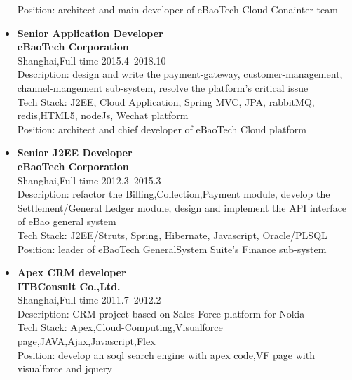 \documentclass[a4paper,11pt]{res}
\begin{document}
\begin{resume}
\begin{itemize}
    Position: architect and main developer of eBaoTech Cloud Conainter team \\
  \item{\bf Senior Application Developer}\\ {\bf eBaoTech Corporation}\\ Shanghai,Full-time \hfill 2015.4--2018.10\\
    
    Description: design and write the payment-gateway,
    customer-management, channel-mangement sub-system,
    resolve the platform's critical issue \\
    
    Tech Stack: J2EE, Cloud Application, Spring 
    MVC, JPA, rabbitMQ, redis,HTML5, nodeJs, Wechat platform  \\
    
    Position: architect and chief developer of eBaoTech Cloud platform \\

  \item{\bf Senior J2EE Developer}\\ {\bf eBaoTech Corporation}\\ Shanghai,Full-time \hfill 2012.3--2015.3\\
    
    Description: refactor the Billing,Collection,Payment module,
    develop the Settlement/General Ledger module, design and
    implement the API interface of eBao general system \\
    
    Tech Stack: J2EE/Struts, Spring, Hibernate, Javascript, Oracle/PLSQL \\
    
    Position: leader of eBaoTech GeneralSystem Suite's Finance sub-system \\

  \item{\bf Apex CRM developer}\\ {\bf ITBConsult Co.,Ltd.}\\ Shanghai,Full-time \hfill 2011.7--2012.2\\

    Description: CRM project based on Sales Force platform for Nokia\\
    
    Tech Stack: Apex,Cloud-Computing,Visualforce page,JAVA,Ajax,Javascript,Flex \\
    
    Position: develop an soql search engine with apex code,VF page with visualforce and jquery\\
    

\end{itemize}
\end{resume}
\end{document}
